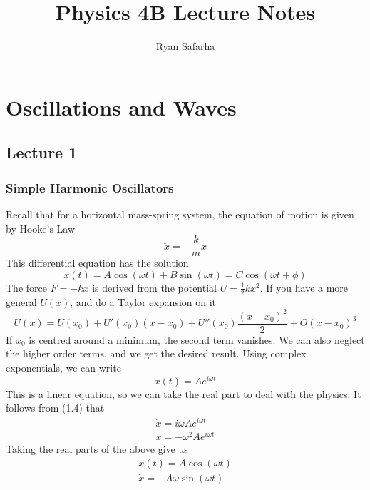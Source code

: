 \documentclass{report}
\title{Physics 4B Lecture Notes}
\author{Ryan Safarha}
\date{}
\numberwithin{equation}{section}
\begin{document}
\maketitle
\tableofcontents
\newpage
\chapter{Oscillations and Waves}
\section{Lecture 1}
\subsection{Simple Harmonic Oscillators}
Recall that for a horizontal mass-spring system, the equation of motion is given by Hooke's Law
\begin{equation}
	\ddot{x} = -\frac{k}{m}x
\end{equation}
This differential equation has the solution
\begin{equation}
	x(t) = A\cos(\omega t) + B\sin(\omega t) = C\cos(\omega t + \phi)
\end{equation}
The force $F =-kx$ is derived from the potential $U = \frac{1}{2}kx^2$. If you have a more general $U(x)$, and do a Taylor expansion on it
\begin{equation}
	U(x) = U(x_0) + U'(x_0)(x-x_0) + U''(x_0)\frac{(x-x_0)^2}{2}+O(x-x_0)^3
\end{equation}
If $x_0$ is centred around a minimum, the second term vanishes. We can also neglect the higher order terms, and we get the desired result. Using complex exponentials, we can write
\begin{equation}
	x(t) = Ae^{i\omega t}
\end{equation}
This is a linear equation, so we can take the real part to deal with the physics. It follows from (1.4) that
\begin{align*}
	\dot{x} = i\omega Ae^{i\omega t}\\
	\ddot{x} = -\omega^2Ae^{i\omega t}
\end{align*}
Taking the real parts of the above give us
\begin{align*}
	x(t) = A\cos(\omega t)\\
	\dot{x} = -A\omega \sin(\omega t)
\end{align*}
\end{document}
